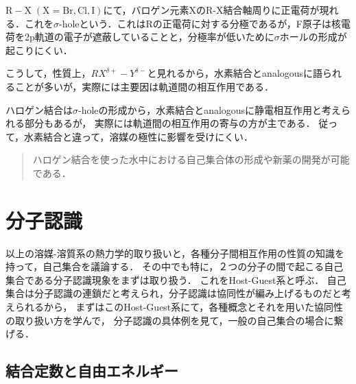 \documentclass[uplatex, dvipdfmx]{jsreport}
\begin{document}
\begin{example}
    $\mathrm{R-X\;(X=Br,Cl,I)}$にて，バロゲン元素XのR-X結合軸周りに正電荷が現れる．これを$\sigma$-holeという．これはRの正電荷に対する分極であるが，F原子は核電荷を2p軌道の電子が遮蔽していることと，分極率が低いために$\sigma$ホールの形成が起こりにくい．
\end{example}
こうして，性質上，$RX^{\delta+}-Y^{\delta-}$と見れるから，水素結合とanalogousに語られることが多いが，実際には主要因は軌道間の相互作用である．

\begin{screen}
    ハロゲン結合は$\sigma$-holeの形成から，水素結合とanalogousに静電相互作用と考えられる部分もあるが，
    実際には軌道間の相互作用の寄与の方が主である．
    従って，水素結合と違って，溶媒の極性に影響を受けにくい．
    \begin{quote}
        ハロゲン結合を使った水中における自己集合体の形成や新薬の開発が可能である．
    \end{quote}
\end{screen}

\chapter{分子認識}
以上の溶媒-溶質系の熱力学的取り扱いと，各種分子間相互作用の性質の知識を持って，自己集合を議論する．
その中でも特に，２つの分子の間で起こる自己集合である分子認識現象をまずは取り扱う．
これをHost-Guest系と呼ぶ．
自己集合は分子認識の連鎖だと考えられ，分子認識は協同性が編み上げるものだと考えられるから，
まずはこのHost-Guest系にて，各種概念とそれを用いた協同性の取り扱い方を学んで，
分子認識の具体例を見て，一般の自己集合の場合に繋げる．

\section{結合定数と自由エネルギー}
\end{document}
